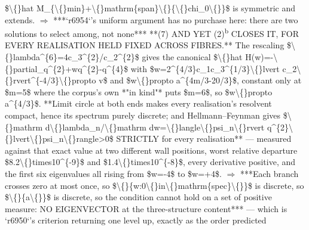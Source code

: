\begin{description}
\$\textbackslash\{\}hat M\_\{\textbackslash\{\}min\}+\textbackslash\{\}mathrm\{span\}\textbackslash\{\}\{\textbackslash\{\}chi\_0\textbackslash\{\}\}\$ is symmetric and extends. \ensuremath{\Rightarrow} ***`r6954`'s uniform argument has no purchase here: there are two solutions to select among, not none***  **(7)  AND YET (2)\textsuperscript{b} CLOSES IT, FOR EVERY REALISATION HELD FIXED ACROSS FIBRES.** The rescaling \$\textbackslash\{\}lambda\textasciicircum{}\{6\}=4c\_3\textasciicircum{}\{2\}/c\_2\textasciicircum{}\{2\}\$ gives the canonical \$\textbackslash\{\}hat H(w)=-\textbackslash\{\}partial\_q\textasciicircum{}\{2\}+wq\textasciicircum{}\{2\}-q\textasciicircum{}\{4\}\$ with \$w=2\textasciicircum{}\{4/3\}c\_1c\_3\textasciicircum{}\{1/3\}\textbackslash\{\}lvert c\_2\textbackslash\{\}rvert\textasciicircum{}\{-4/3\}\textbackslash\{\}propto v\$ and \$w\textbackslash\{\}propto a\textasciicircum{}\{4m/3-20/3\}\$, constant only at \$m=5\$ where the corpus's own *"in kind"* puts \$m=6\$, so \$w\textbackslash\{\}propto a\textasciicircum{}\{4/3\}\$. **Limit circle at both ends makes every realisation's resolvent compact, hence its spectrum purely discrete; and Hellmann--Feynman gives \$\textbackslash\{\}mathrm d\textbackslash\{\}lambda\_n/\textbackslash\{\}mathrm dw=\textbackslash\{\}langle\textbackslash\{\}psi\_n\textbackslash\{\}rvert q\textasciicircum{}\{2\}\textbackslash\{\}lvert\textbackslash\{\}psi\_n\textbackslash\{\}rangle>0\$ STRICTLY for every realisation** --- measured against that exact value at two different wall positions, worst relative departure \$8.2\textbackslash\{\}times10\textasciicircum{}\{-9\}\$ and \$1.4\textbackslash\{\}times10\textasciicircum{}\{-8\}\$, every derivative positive, and the first six eigenvalues all rising from \$w=-4\$ to \$w=+4\$. \ensuremath{\Rightarrow} ***Each branch crosses zero at most once, so \$\textbackslash\{\}\{w:0\textbackslash\{\}in\textbackslash\{\}mathrm\{spec\}\textbackslash\{\}\}\$ is discrete, so \$\textbackslash\{\}\{a\textbackslash\{\}\}\$ is discrete, so the condition cannot hold on a set of positive measure: NO EIGENVECTOR at the three-structure content*** --- which is `r6950`'s criterion returning one level up, exactly as the order predicted

\end{description}
